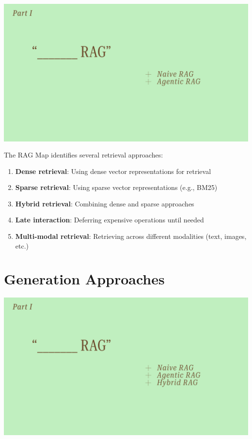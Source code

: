 \documentclass[
  letterpaper,
  oneside]{scrbook}
\providecommand{\tightlist}{%
  \setlength{\itemsep}{0pt}\setlength{\parskip}{0pt}}\usepackage{longtable,booktabs,array}
\begin{document}
\includegraphics{chapters/../p5-images/slide_4.png}

The RAG Map identifies several retrieval approaches:

\begin{enumerate}
\def\labelenumi{\arabic{enumi}.}
\tightlist
\item
  \textbf{Dense retrieval}: Using dense vector representations for
  retrieval
\item
  \textbf{Sparse retrieval}: Using sparse vector representations (e.g.,
  BM25)
\item
  \textbf{Hybrid retrieval}: Combining dense and sparse approaches
\item
  \textbf{Late interaction}: Deferring expensive operations until needed
\item
  \textbf{Multi-modal retrieval}: Retrieving across different modalities
  (text, images, etc.)
\end{enumerate}

\section{Generation Approaches}\label{generation-approaches}

\includegraphics{chapters/../p5-images/slide_5.png}
\end{document}
